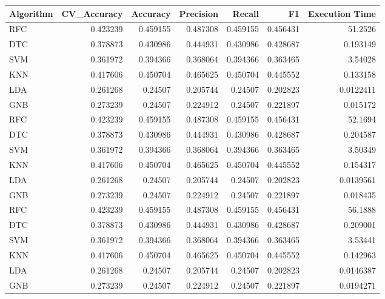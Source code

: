 \documentclass[conference,onecolumn]{IEEEtran}
\begin{document}
    \begin{tabular}{lrrrrrr}
        \hline
         Algorithm   &   CV\_Accuracy &   Accuracy &   Precision &   Recall &       F1 &   Execution Time \\
        \hline
         RFC         &      0.423239 &   0.459155 &    0.487308 & 0.459155 & 0.456431 &       51.2526    \\
         DTC         &      0.378873 &   0.430986 &    0.444931 & 0.430986 & 0.428687 &        0.193149  \\
         SVM         &      0.361972 &   0.394366 &    0.368064 & 0.394366 & 0.363465 &        3.54028   \\
         KNN         &      0.417606 &   0.450704 &    0.465625 & 0.450704 & 0.445552 &        0.133158  \\
         LDA         &      0.261268 &   0.24507  &    0.205744 & 0.24507  & 0.202823 &        0.0122411 \\
         GNB         &      0.273239 &   0.24507  &    0.224912 & 0.24507  & 0.221897 &        0.015172  \\
         RFC         &      0.423239 &   0.459155 &    0.487308 & 0.459155 & 0.456431 &       52.1694    \\
         DTC         &      0.378873 &   0.430986 &    0.444931 & 0.430986 & 0.428687 &        0.204587  \\
         SVM         &      0.361972 &   0.394366 &    0.368064 & 0.394366 & 0.363465 &        3.50349   \\
         KNN         &      0.417606 &   0.450704 &    0.465625 & 0.450704 & 0.445552 &        0.154317  \\
         LDA         &      0.261268 &   0.24507  &    0.205744 & 0.24507  & 0.202823 &        0.0139561 \\
         GNB         &      0.273239 &   0.24507  &    0.224912 & 0.24507  & 0.221897 &        0.018435  \\
         RFC         &      0.423239 &   0.459155 &    0.487308 & 0.459155 & 0.456431 &       56.1888    \\
         DTC         &      0.378873 &   0.430986 &    0.444931 & 0.430986 & 0.428687 &        0.209001  \\
         SVM         &      0.361972 &   0.394366 &    0.368064 & 0.394366 & 0.363465 &        3.53441   \\
         KNN         &      0.417606 &   0.450704 &    0.465625 & 0.450704 & 0.445552 &        0.142963  \\
         LDA         &      0.261268 &   0.24507  &    0.205744 & 0.24507  & 0.202823 &        0.0146387 \\
         GNB         &      0.273239 &   0.24507  &    0.224912 & 0.24507  & 0.221897 &        0.0194271 \\
        \hline
    \end{tabular}
\newpage


\end{document}
